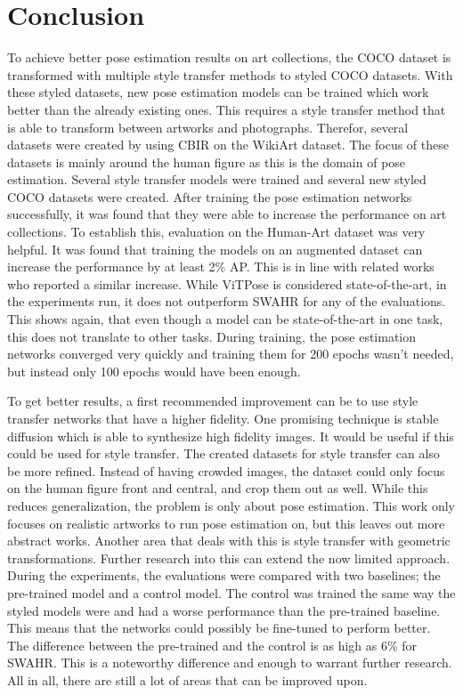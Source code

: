 \documentclass[conference]{IEEEtran}
\begin{document}
\section{Conclusion}
To achieve better pose estimation results on art collections, the COCO dataset is transformed with multiple style transfer methods to styled COCO datasets.
With these styled datasets, new pose estimation models can be trained which work better than the already existing ones.
This requires a style transfer method that is able to transform between artworks and photographs.
Therefor, several datasets were created by using CBIR on the WikiArt dataset.
The focus of these datasets is mainly around the human figure as this is the domain of pose estimation.
Several style transfer models were trained and several new styled COCO datasets were created.
After training the pose estimation networks successfully, it was found that they were able to increase the performance on art collections.
To establish this, evaluation on the Human-Art dataset was very helpful.
It was found that training the models on an augmented dataset can increase the performance by at least 2\% AP.
This is in line with related works who reported a similar increase.
While ViTPose is considered state-of-the-art, in the experiments run, it does not outperform SWAHR for any of the evaluations.
This shows again, that even though a model can be state-of-the-art in one task, this does not translate to other tasks.
During training, the pose estimation networks converged very quickly and training them for 200 epochs wasn't needed, but instead only 100 epochs would have been enough.

To get better results, a first recommended improvement can be to use style transfer networks that have a higher fidelity.
One promising technique is stable diffusion \cite{rombach2021} which is able to synthesize high fidelity images.
It would be useful if this could be used for style transfer.
The created datasets for style transfer can also be more refined.
Instead of having crowded images, the dataset could only focus on the human figure front and central, and crop them out as well.
While this reduces generalization, the problem is only about pose estimation.
This work only focuses on realistic artworks to run pose estimation on, but this leaves out more abstract works.
Another area that deals with this is style transfer with geometric transformations.
Further research into this can extend the now limited approach.
During the experiments, the evaluations were compared with two baselines; the pre-trained model and a control model.
The control was trained the same way the styled models were and had a worse performance than the pre-trained baseline.
This means that the networks could possibly be fine-tuned to perform better.
The difference between the pre-trained and the control is as high as 6\% for SWAHR.
This is a noteworthy difference and enough to warrant further research.
All in all, there are still a lot of areas that can be improved upon.
\end{document}
